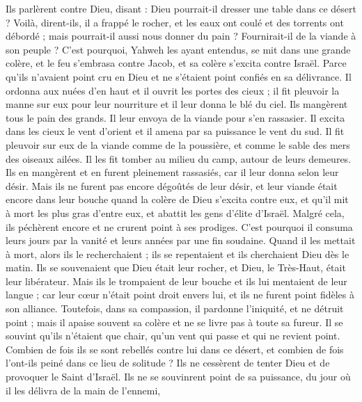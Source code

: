 \begin{multicols}{2}
Ils parlèrent contre Dieu, disant : Dieu pourrait-il dresser une table dans ce désert ?
Voilà, dirent-ils, il a frappé le rocher, et les eaux ont coulé et des torrents ont débordé ; mais pourrait-il aussi nous donner du pain ? Fournirait-il de la viande à son peuple ?
C'est pourquoi, Yahweh les ayant entendus, se mit dans une grande colère, et le feu s'embrasa contre Jacob, et sa colère s'excita contre Israël.
Parce qu'ils n'avaient point cru en Dieu et ne s'étaient point confiés en sa délivrance.
Il ordonna aux nuées d'en haut et il ouvrit les portes des cieux ;
il fit pleuvoir la manne sur eux pour leur nourriture et il leur donna le blé du ciel.
Ils mangèrent tous le pain des grands. Il leur envoya de la viande pour s'en rassasier.
Il excita dans les cieux le vent d'orient et il amena par sa puissance le vent du sud.
Il fit pleuvoir sur eux de la viande comme de la poussière, et comme le sable des mers des oiseaux ailées.
Il les fit tomber au milieu du camp, autour de leurs demeures.
Ils en mangèrent et en furent pleinement rassasiés, car il leur donna selon leur désir.
Mais ils ne furent pas encore dégoûtés de leur désir, et leur viande était encore dans leur bouche
quand la colère de Dieu s'excita contre eux, et qu'il mit à mort les plus gras d'entre eux, et abattit les gens d'élite d'Israël.
Malgré cela, ils péchèrent encore et ne crurent point à ses prodiges.
C'est pourquoi il consuma leurs jours par la vanité et leurs années par une fin soudaine.
Quand il les mettait à mort, alors ils le recherchaient ; ils se repentaient et ils cherchaient Dieu dès le matin.
Ils se souvenaient que Dieu était leur rocher, et Dieu, le Très-Haut, était leur libérateur.
Mais ils le trompaient de leur bouche et ils lui mentaient de leur langue ;
car leur cœur n'était point droit envers lui, et ils ne furent point fidèles à son alliance.
Toutefois, dans sa compassion, il pardonne l’iniquité, et ne détruit point ; mais il apaise souvent sa colère et ne se livre pas à toute sa fureur.
Il se souvint qu'ils n’étaient que chair, qu'un vent qui passe et qui ne revient point.
Combien de fois ils se sont rebellés contre lui dans ce désert, et combien de fois l'ont-ils peiné dans ce lieu de solitude ?
Ils ne cessèrent de tenter Dieu et de provoquer le Saint d'Israël.
Ils ne se souvinrent point de sa puissance, du jour où il les délivra de la main de l’ennemi,

\end{multicols}
